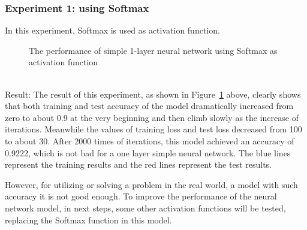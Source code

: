 \documentclass[]{UCD_CS_FYP_Report}
\begin{document}
\subsubsection{Experiment 1: using Softmax}
In this experiment, Softmax is used as activation function.
\begin{figure}[h]
\centering
\fboxsep 2mm
\caption{\label{fig:MNIST_fully_coneected_S1E1} The performance of simple 1-layer neural network using Softmax as activation function}
\end{figure}
\\Result: The result of this experiment, as shown in Figure~\ref{fig:MNIST_fully_coneected_S1E1} above, clearly shows that both training and test accuracy of the model dramatically increased from zero to about 0.9 at the very beginning and then climb slowly as the increase of iterations. Meanwhile the values of training loss and test loss decreased from 100 to about 30. After 2000 times of iterations, this model achieved an accuracy of 0.9222, which is not bad for a one layer simple neural network. The blue lines represent the training results and the red lines represent the test results.

However, for utilizing or solving a problem in the real world, a model with such accuracy it is not good enough. To improve the performance of the neural network model, in next steps, some other activation functions will be tested, replacing the Softmax function in this model.
\end{document}
